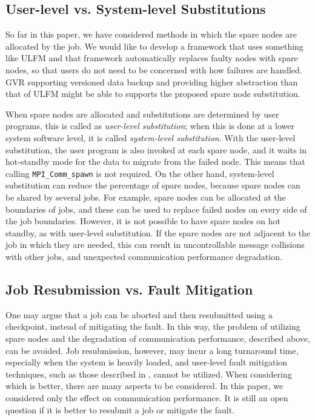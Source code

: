 \documentclass[Afour,times,sagev]{sagej}
\begin{document}
\subsection{User-level vs. System-level Substitutions}

So far in this paper, we have considered methods in which the spare
nodes are allocated by the job. We would like to develop a framework
that uses something like ULFM and that framework automatically
replaces faulty nodes with spare nodes, so that users do not need to
be concerned with how failures are handled. GVR supporting versioned
data backup and providing higher abstraction than that of ULFM might
be able to supports the proposed spare node substitution.

When spare nodes are
allocated and substitutions are determined by user programs, this is
called as {\it user-level substitution}; when this is done at a lower
system software level, it is called {\it system-level substitution}.
With the user-level substitution, the user program is also invoked at
each spare node, and it waits in hot-standby mode for the data to migrate
from the failed node. This means that calling {\tt MPI\_Comm\_spawn}
is not required. On the other hand, system-level substitution can
reduce the percentage of spare nodes, because spare nodes can be
shared by several jobs. For example, spare nodes can be allocated at
the boundaries of jobs, and these can be used to replace failed nodes
on every side of the job boundaries. However, it is not possible to have
spare nodes on hot standby, as with user-level substitution. If the
spare nodes are not adjacent to the job in which they are needed, this
can result in uncontrollable message collisions with other jobs, and
unexpected communication performance degradation.

\subsection{Job Resubmission vs. Fault Mitigation}

One may argue that a job can be aborted and then resubmitted using a
checkpoint, instead of mitigating the fault. In this way, the problem
of utilizing spare nodes and the degradation of communication
performance, described above, can be avoided. Job resubmission,
however, may incur a long turnaround time, especially when the system
is heavily loaded, and user-level fault mitigation techniques, such as
those described in \citep{Davies:2011:HPL:1995896.1995923}, cannot be
utilized. When considering which is better, there are many aspects to
be considered. In this paper, we considered only the effect on
communication performance. It is still an open question if it is
better to resubmit a job or mitigate the fault.
\end{document}
